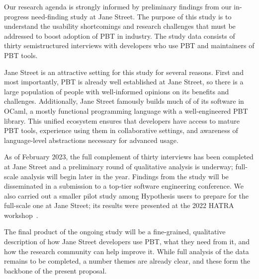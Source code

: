 %
Our research agenda is strongly informed by preliminary findings from
our in-progress need-finding study at Jane Street.  The purpose of this
study is to understand the usability shortcomings and research
challenges that must be addressed to boost adoption of PBT in
industry. The study data consists of thirty semistructured interviews
with developers who use PBT and maintainers of PBT tools.

Jane Street is
an attractive setting for this study for several reasons.  First and most
importantly, PBT is
already well established at Jane Street, so there is a large
population of people with well-informed opinions on its benefits and
challenges. Additionally, Jane Street famously builds much of of its
software in OCaml, a mostly functional programming language with
a well-engineered PBT library. This unified
ecosystem ensures that developers have access to mature PBT tools,
experience using them in collaborative settings,
and awareness of language-level abstractions necessary
for advanced usage.

As of February 2023, the full complement of thirty interviews has been
completed at Jane Street and a preliminary round of qualitative
analysis is underway; full-scale analysis will begin later in the year.
Findings from the study will be disseminated in a submission to a
top-tier software engineering conference.  We also carried out a
smaller pilot study among Hypothesis users to prepare for the
full-scale one at Jane Street; its results were presented at the
2022 HATRA workshop~\cite{goldstein_problems_2022}.

 The final product of
the ongoing study will be a fine-grained, qualitative description of how
Jane Street developers use PBT, what they need from it, and how the
research community can
help improve it.  While full analysis of the data remains
to be completed, a number themes are already clear, and these form the
backbone of the present proposal.

